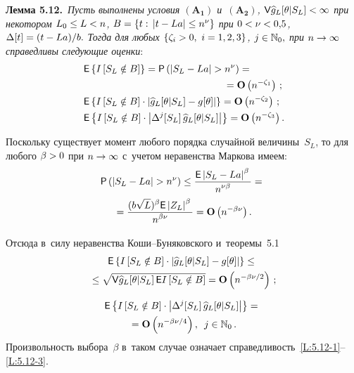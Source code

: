 \begin{multicols}{2}
 \smallskip

\noindent
\textbf{Лемма 5.12.}\
\textit{Пусть выполнены условия $\mathbf{(A_1)}$ и~$\mathbf{(A_2)}$,
  $\Vp \widehat{g}_L[\theta|S_L]\hm<\infty$ при некотором $L_0\hm\le L \hm<n$,
  $B\hm=\left\{t:\,|t-La|\hm\le n^\nu\right\}$ при $0\hm<\nu\hm<0{,}5$,
$\Delta[t]\hm=(t\hm-La)/b.$
 Тогда для любых $\left\{\zeta_i\hm>0,\ i\hm=1,2,3\right\}$, $j\hm\in\Np_0,$ при
 $n\hm\to\infty$ справедливы следующие оценки}:
 \begin{align}
 &\Ep\left\{ I\left[S_L\notin B\right]\right\}={\sf P}\left(\left|S_L - 
 La \right|>n^{\nu}\right)={}\notag\\
 &\hspace*{50mm}{}=\Op\left( n^{-\zeta_1}\right)\,;
\label{L:5.12-1}
 \\
  &
  \Ep\left\{ I\left[S_L\notin B\right]\cdot
  \left| \widehat{g}_L[\theta|S_L]-g[\theta]\right|\right\}
  =\Op\left( n^{-\zeta_2}\right)\,;
 \label{L:5.12-2}\\
 &   \Ep\left\{ I\left[S_L\notin B\right]\cdot
  \left|\Delta^{j}[S_L]\, \widehat{g}_L[\theta|S_L]\right|\right\}
  =\Op\left( n^{-\zeta_3}\right).\!\!
 \label{L:5.12-3}
  \end{align}

 \Do
  Поскольку существует момент любого порядка случайной величины~$S_L$, 
  то для любого $\beta\hm>0$ при $n\hm\to\infty$ с~учетом неравенства Маркова имеем:
 \begin{multline*}
{\sf P}\left(\left|S_L - La \right|>n^{\nu}\right)\le
  \fr{\Ep \left|S_L-La \right|^\beta}{n^{\nu \beta}}={}\\
  {}=
  \fr{(b\sqrt{L})^\beta\Ep \left|Z_L\right|^\beta}{n^{\beta\nu }}=
  \Op\left( n^{-\beta\nu}\right).
 \end{multline*}


  Отсюда в~силу неравенства Ко\-ши--Бу\-ня\-ков\-ско\-го и~тео\-ре\-мы~5.1
  \begin{multline*}
    {\sf E}\left\{ I\left[S_L\notin B\right]\cdot
  \left| \widehat{g}_L[\theta|S_L]-g[\theta]\right|\right\}\le{}
  \\
  {}  \le\sqrt{{\sf V} \widehat{g}_L[\theta|S_L]\,
  {\sf E} I\left[S_L\notin B\right] } =
   \mathbf{O}\left( n^{-{\beta\nu/2}}\right)\,;
  \end{multline*}

\vspace*{-12pt}

\noindent
\begin{multline*}
  {\sf E}\left\{ I\left[S_L\notin B\right]\cdot
  \left|\Delta^{j}[S_L]\, \widehat{g}_L[\theta|S_L]\right|\right\}
  ={}\\
  {}=\mathbf{O}\left( n^{-{\beta\nu/4}}\right),\enskip  j\in\mathbb{N}_0\,.
  \end{multline*}
  Произвольность выбора~$\beta$ в~таком случае означает справедливость~\eqref{L:5.12-1}--\eqref{L:5.12-3}.



\end{multicols}
